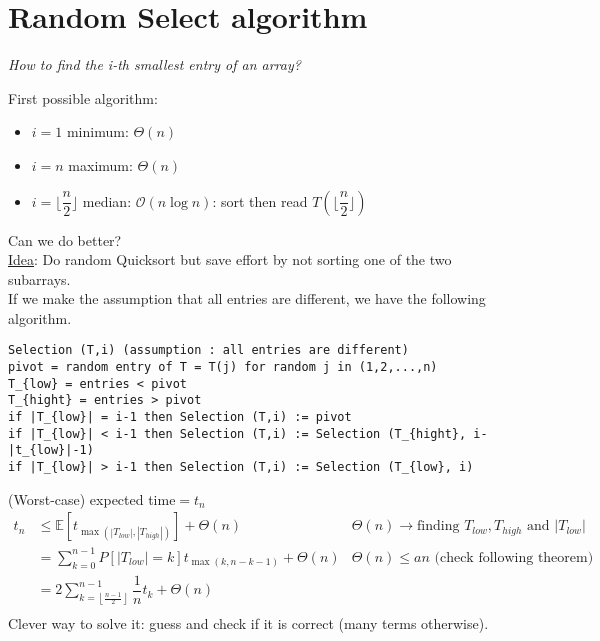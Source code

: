 \section{Random Select algorithm}
\textit{How to find the i-th smallest entry of an array?}
\begin{example}
\begin{leftbar}
First possible algorithm:
\begin{itemize}
\item $i=1$   minimum: $\Theta(n)$
\item $i=n$   maximum: $\Theta(n)$
\item $i=\lfloor \dfrac{n}{2}\rfloor$ median: $\mathcal{O}(n\log n)$: sort then read $T(\lfloor \dfrac{n}{2}\rfloor)$
\end{itemize}
\end{leftbar}
\end{example}

Can we do better?\\
\underline{Idea}: Do random Quicksort but save effort by not sorting one of the two subarrays.\\

If we make the assumption that all entries are different, we have the following algorithm.

\begin{lstlisting}[label={list:c3:select},caption={Selection (T,i)}]
Selection (T,i) (assumption : all entries are different)
pivot = random entry of T = T(j) for random j in (1,2,...,n)
T_{low} = entries < pivot
T_{hight} = entries > pivot
if |T_{low}| = i-1 then Selection (T,i) := pivot
if |T_{low}| < i-1 then Selection (T,i) := Selection (T_{hight}, i-|t_{low}|-1)
if |T_{low}| > i-1 then Selection (T,i) := Selection (T_{low}, i)
\end{lstlisting}

(Worst-case) expected time$=t_n$
\begin{align*}
t_n &\leq \mathbb{E}[t_{\max(|T_{low}|,|T_{high}|)}]+\Theta (n) & \Theta (n)\rightarrow \text{finding }T_{low},T_{high}\text{ and }|T_{low}|\\
&=\sum\limits_{k=0}^{n-1}P[|T_{low}|=k]t_{\max(k,n-k-1)}+\Theta (n) & \Theta (n)\leq an \text{ (check following theorem)}\\
&=2\sum\limits_{k=\left\lfloor \frac{n-1}{2}\right\rfloor}^{n-1}\dfrac{1}{n}t_k+\Theta (n)&\\
\end{align*}
Clever way to solve it: guess and check if it is correct (many terms otherwise).\\

